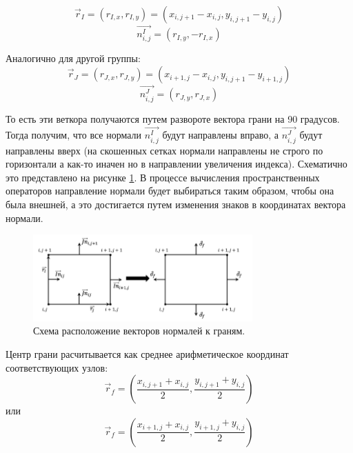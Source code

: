 \begin{equation}
    \vec{r}_I = (r_{I,x}, r_{I,y}) = (x_{i,j+1} - x_{i,j}, y_{i,j+1} - y_{i,j})
\end{equation}
\begin{equation}
    \vec{n_{i,j}^I} = (r_{I,y}, -r_{I,x})
\end{equation}

Аналогично для другой группы:
\begin{equation}
    \vec{r}_J = (r_{J,x}, r_{J,y}) = (x_{i+1,j} - x_{i,j}, y_{i,j+1} - y_{i+1,j})
\end{equation}
\begin{equation}
    \vec{n_{i,j}^J} = (r_{J,y}, r_{J,x})
\end{equation}

То есть эти веткора получаются путем развороте вектора грани на 90 градусов. Тогда получим, что все нормали $\vec{n_{i,j}^I}$ будут направлены вправо, а $\vec{n_{i,j}^J}$ будут направлены вверх (на скошенных сетках нормали направлены не строго по горизонтали а как-то иначен но в направлении увеличения индекса). Схематично это представлено на рисунке \ref{fig:4}. В процессе вычисления пространственных операторов направление нормали будет выбираться таким образом, чтобы она была внешней, а это достигается путем изменения знаков в координатах вектора нормали.


\begin{figure}[H]
    \centering
    \includegraphics[width=0.75\textwidth]{img/4.png}
    \caption{Схема расположение векторов нормалей к граням.}
    \label{fig:4}
\end{figure}

Центр грани расчитывается как среднее арифметическое координат соответствующих узлов:
\begin{equation}
    \vec{r}_f = (\frac{x_{i,j+1}+x_{i,j}}{2}, \frac{y_{i,j+1}+y_{i,j}}{2}) 
\end{equation}
или
\begin{equation}
    \vec{r}_f = (\frac{x_{i+1,j}+x_{i,j}}{2}, \frac{y_{i+1,j}+y_{i,j}}{2}) 
\end{equation}

